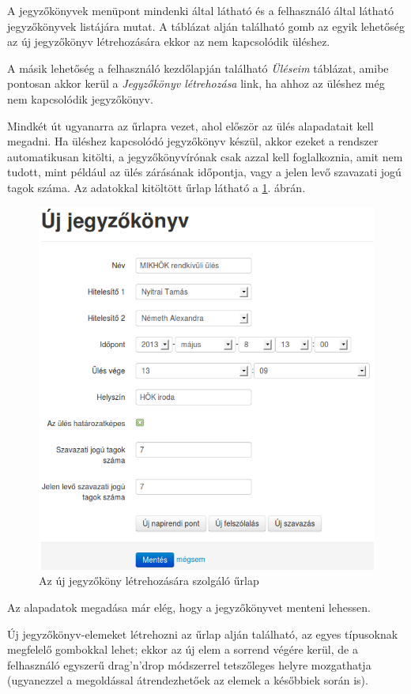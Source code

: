 \documentclass[a4paper,12pt,oneside]{report}
\begin{document}
A jegyzőkönyvek menüpont mindenki által látható és a felhasználó által látható jegyzőkönyvek listájára mutat. A táblázat alján található gomb az egyik lehetőség az új jegyzőkönyv létrehozására \textendash{} ekkor az nem kapcsolódik üléshez.

A másik lehetőség a felhasználó kezdőlapján található {\it Üléseim} táblázat, amibe pontosan akkor kerül a {\it Jegyzőkönyv létrehozása} link, ha ahhoz az üléshez még nem kapcsolódik jegyzőkönyv.

Mindkét út ugyanarra az űrlapra vezet, ahol először az ülés alapadatait kell megadni. Ha üléshez kapcsolódó jegyzőkönyv készül, akkor ezeket a rendszer automatikusan kitölti, a jegyzőkönyvírónak csak azzal kell foglalkoznia, amit nem tudott, mint például az ülés zárásának időpontja, vagy a jelen levő szavazati jogú tagok száma. Az adatokkal kitöltött űrlap látható a \ref{fig:jegyzokonyv_uj}. ábrán.

\begin{figure}[h]
    \centering
    \includegraphics[width=.9\textwidth]{jegyzokonyv_uj.png}
    \caption{Az új jegyzőköny létrehozására szolgáló űrlap}
    \label{fig:jegyzokonyv_uj}
\end{figure}

Az alapadatok megadása már elég, hogy a jegyzőkönyvet menteni lehessen.

Új jegyzőkönyv-elemeket létrehozni az űrlap alján található, az egyes típusoknak megfelelő gombokkal lehet; ekkor az új elem a sorrend végére kerül, de a felhasználó egyszerű drag'n'drop módszerrel tetszőleges helyre mozgathatja (ugyanezzel a megoldással átrendezhetőek az elemek a későbbiek során is).
\end{document}
